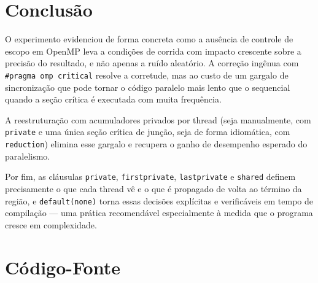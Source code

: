 \documentclass[a4paper,12pt]{article}
\begin{document}
\section{Conclusão}

O experimento evidenciou de forma concreta como a ausência de controle de escopo em OpenMP leva a condições de corrida com impacto crescente sobre a 
precisão do resultado, e não apenas a ruído aleatório. A correção ingênua com \texttt{\#pragma omp critical} 
resolve a corretude, mas ao custo de um gargalo de sincronização que pode tornar o código paralelo mais lento que o sequencial quando a seção crítica é executada com muita frequência. 

A reestruturação com acumuladores privados por thread (seja manualmente, com \texttt{private} e uma única seção crítica de junção, seja de forma idiomática, 
com \texttt{reduction}) elimina esse gargalo e recupera o ganho de desempenho esperado do paralelismo. 

Por fim, as cláusulas \texttt{private}, \texttt{firstprivate}, \texttt{lastprivate} e \texttt{shared} definem precisamente o que cada thread vê e o que é propagado de volta ao término da região, e \texttt{default(none)} 
torna essas decisões explícitas e verificáveis em tempo de compilação — uma prática recomendável especialmente à medida que o programa cresce em complexidade.

\newpage
\appendix

\section{Código-Fonte}
\label{ap:codigo}


\end{document}
